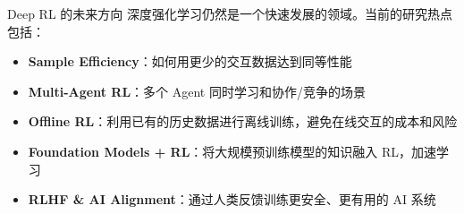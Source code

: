 \documentclass[a4paper]{article}
\begin{document}
\begin{knowledgebox}{Deep RL 的未来方向}
深度强化学习仍然是一个快速发展的领域。当前的研究热点包括：
\begin{itemize}
    \item \textbf{Sample Efficiency}：如何用更少的交互数据达到同等性能
    \item \textbf{Multi-Agent RL}：多个 Agent 同时学习和协作/竞争的场景
    \item \textbf{Offline RL}：利用已有的历史数据进行离线训练，避免在线交互的成本和风险
    \item \textbf{Foundation Models + RL}：将大规模预训练模型的知识融入 RL，加速学习
    \item \textbf{RLHF \& AI Alignment}：通过人类反馈训练更安全、更有用的 AI 系统
\end{itemize}
\end{knowledgebox}


\end{document}
